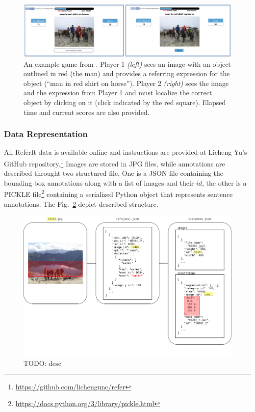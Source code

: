 \begin{figure}
  \includegraphics[width=\textwidth]{figures/referitgame-example.png}
  \caption[ReferIt Game Example.]{An example game from . Player 1 \textit{(left)} sees an image with an object
  outlined in red (the man) and provides a referring expression for
  the object (``man in red shirt on horse''). Player 2
  \textit{(right)} sees the image and the expression from Player 1 and
  must localize the correct object by clicking on it (click indicated
  by the red square). Elapsed time and current scores are also
  provided.}
  \label{fig:referitgame-example}
\end{figure}

\subsubsection{Data Representation}
\label{subsec:referit-data-representation}

All ReferIt data is available online and instructions are provided at
Licheng Yu's GitHub
repository.\footnote{\href{https://github.com/lichengunc/refer}{https://github.com/lichengunc/refer}}
Images are stored in JPG files, while annotations are described
throught two structured file. One is a JSON file containing the
bounding box annotations along with a list of images and their $id$,
the other is a PICKLE
file\footnote{\href{https://docs.python.org/3/library/pickle.html}{https://docs.python.org/3/library/pickle.html}}
containing a serialized Python object that represents sentence
annotations. The Fig.~\ref{fig:referit-technical-data-representation} depict
described structure.

\begin{figure}
  \includegraphics[width=\textwidth]{figures/referit-document-specification.png}
  \caption[TODO]{TODO: desc}
  \label{fig:referit-technical-data-representation}
\end{figure}

